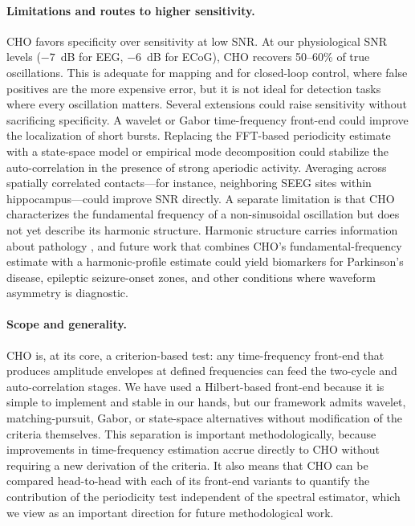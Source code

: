 \documentclass[11pt]{article}
\begin{document}
\paragraph{Limitations and routes to higher sensitivity.}
CHO favors specificity over sensitivity at low SNR. At our physiological SNR levels ($-7$~dB for EEG, $-6$~dB for ECoG), CHO recovers 50--60\% of true oscillations. This is adequate for mapping and for closed-loop control, where false positives are the more expensive error, but it is not ideal for detection tasks where every oscillation matters. Several extensions could raise sensitivity without sacrificing specificity. A wavelet or Gabor time-frequency front-end could improve the localization of short bursts. Replacing the FFT-based periodicity estimate with a state-space model or empirical mode decomposition \citep{quinn2021within} could stabilize the auto-correlation in the presence of strong aperiodic activity. Averaging across spatially correlated contacts---for instance, neighboring SEEG sites within hippocampus---could improve SNR directly. A separate limitation is that CHO characterizes the fundamental frequency of a non-sinusoidal oscillation but does not yet describe its harmonic structure. Harmonic structure carries information about pathology \citep{cole2017waveform}, and future work that combines CHO's fundamental-frequency estimate with a harmonic-profile estimate could yield biomarkers for Parkinson's disease, epileptic seizure-onset zones, and other conditions where waveform asymmetry is diagnostic.

\paragraph{Scope and generality.}
CHO is, at its core, a criterion-based test: any time-frequency front-end that produces amplitude envelopes at defined frequencies can feed the two-cycle and auto-correlation stages. We have used a Hilbert-based front-end because it is simple to implement and stable in our hands, but our framework admits wavelet, matching-pursuit, Gabor, or state-space alternatives without modification of the criteria themselves. This separation is important methodologically, because improvements in time-frequency estimation accrue directly to CHO without requiring a new derivation of the criteria. It also means that CHO can be compared head-to-head with each of its front-end variants to quantify the contribution of the periodicity test independent of the spectral estimator, which we view as an important direction for future methodological work.
\end{document}
